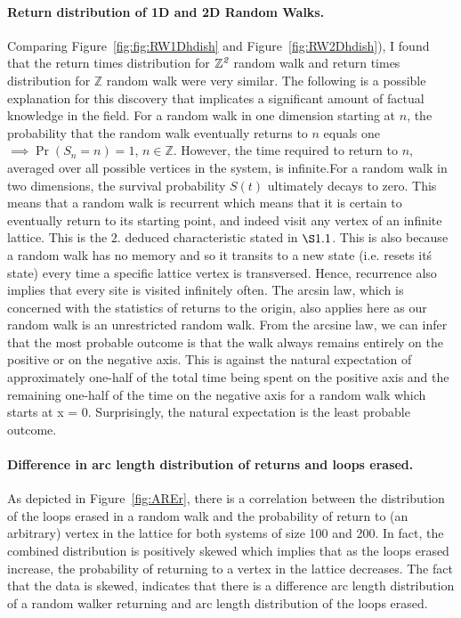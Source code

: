 \documentclass{article}
\begin{document}
\paragraph{Return distribution of 1D and 2D Random Walks.} Comparing Figure~\ref{fig:fig:RW1Dhdish} and Figure~\ref{fig:RW2Dhdish}), I found that the return times distribution for $\mathbb{Z}^{\emph{2}}$ random walk and return times distribution for $\mathbb{Z}$ random walk were very similar. The following is a possible explanation for this discovery that implicates a significant amount of factual knowledge in the field. For a random walk in one dimension starting at $n$, the probability that the random walk eventually returns to $n$ equals one \cite{Redner2002} $\implies \Pr(S_{n}=n) = 1$, $n \in \mathbb{Z}$. However, the time required to return to $n$, averaged over all possible vertices in the system, is infinite.For a random walk in two dimensions, the survival probability $S(t)$ ultimately decays to zero. This means that a random walk is recurrent which means that it is certain to eventually return to its starting point, and indeed visit any vertex of an infinite lattice. This is the $2.$ deduced characteristic stated in $\S1.1$.  This is also because a random walk has no memory and so it transits to a new state (i.e. resets it\' s state) every time a specific lattice vertex is transversed. Hence, recurrence also implies that every site is visited infinitely often.
The arcsin law, which is concerned with the statistics of returns to the origin, also applies here as our random walk is an unrestricted random walk. From the arcsine law, we can infer that the most probable outcome is that the walk always remains entirely on the positive or on the negative axis. This is against the natural expectation of approximately one-half of the total time being spent on the positive axis and the remaining one-half of the time on the negative axis for a random walk which starts at x = 0. Surprisingly, the natural expectation is the least probable outcome.
\paragraph{Difference in arc length distribution of returns and loops erased.} As depicted in Figure~\ref{fig:AREr}, there is a correlation between the distribution of the loops erased in a random walk and the probability of return to (an arbitrary) vertex in the lattice for both systems of size 100 and 200. In fact, the combined distribution is positively skewed which implies that as the loops erased increase, the probability of returning to a vertex in the lattice decreases. The fact that the data is skewed, indicates that there is a difference arc length distribution of a random walker returning and arc length distribution of the loops erased.
\newpage
\end{document}
